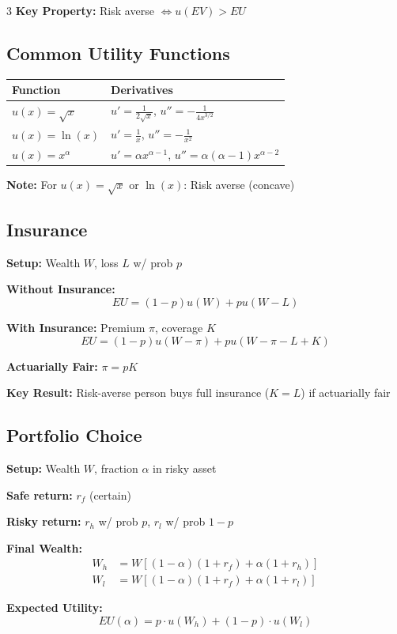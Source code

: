 \documentclass[8pt,landscape,letterpaper]{extarticle}
\begin{document}
\begin{multicols}{3}
\textbf{Key Property:} Risk averse $\iff u(EV) > EU$

\subsection*{Common Utility Functions}
\begin{tabular}{ll}
\toprule
\textbf{Function} & \textbf{Derivatives} \\
\midrule
$u(x) = \sqrt{x}$ & $u' = \frac{1}{2\sqrt{x}}$, $u'' = -\frac{1}{4x^{3/2}}$ \\
$u(x) = \ln(x)$ & $u' = \frac{1}{x}$, $u'' = -\frac{1}{x^2}$ \\
$u(x) = x^\alpha$ & $u' = \alpha x^{\alpha-1}$, $u'' = \alpha(\alpha-1)x^{\alpha-2}$ \\
\bottomrule
\end{tabular}

\textbf{Note:} For $u(x) = \sqrt{x}$ or $\ln(x)$: Risk averse (concave)

\subsection*{Insurance}
\textbf{Setup:} Wealth $W$, loss $L$ w/ prob $p$

\textbf{Without Insurance:}
\[
EU = (1-p) u(W) + p u(W-L)
\]

\textbf{With Insurance:} Premium $\pi$, coverage $K$
\[
EU = (1-p) u(W-\pi) + p u(W-\pi-L+K)
\]

\textbf{Actuarially Fair:} $\pi = pK$

\textbf{Key Result:} Risk-averse person buys full insurance ($K=L$) if actuarially fair

\subsection*{Portfolio Choice}
\textbf{Setup:} Wealth $W$, fraction $\alpha$ in risky asset

\textbf{Safe return:} $r_f$ (certain)

\textbf{Risky return:} $r_h$ w/ prob $p$, $r_l$ w/ prob $1-p$

\textbf{Final Wealth:}
\begin{align*}
W_h &= W[(1-\alpha)(1+r_f) + \alpha(1+r_h)] \\
W_l &= W[(1-\alpha)(1+r_f) + \alpha(1+r_l)]
\end{align*}

\textbf{Expected Utility:}
\[
EU(\alpha) = p \cdot u(W_h) + (1-p) \cdot u(W_l)
\]


\end{multicols}
\end{document}
